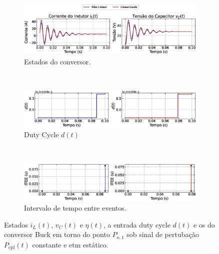 \begin{figure}[H]
  \centering
  \captionsetup{justification=centering}
  \begin{subfigure}{1.\textwidth}
    \centering
    \includegraphics[width=1.\textwidth]{figuras/dynamic-etm/buck/sim1/op1/result.eps}
    \caption{Estados do conversor.}
    \label{fig:buck_converter_constant_pcpl_dynamic_etm_op1_a}
  \end{subfigure}
  \\[6pt]
  \begin{subfigure}{1.\textwidth}
    \centering
    \includegraphics[width=1.\textwidth]{figuras/dynamic-etm/buck/sim1/op1/duty-cycle.eps}
    \caption{Duty Cycle $d(t)$}
    \label{fig:buck_converter_constant_pcpl_dynamic_etm_op1_b}
  \end{subfigure}
  \\[6pt]
  \begin{subfigure}{1.\textwidth}
    \centering
    \includegraphics[width=1.\textwidth]{figuras/dynamic-etm/buck/sim1/op1/inter-event-times.eps}
    \caption{Intervalo de tempo entre eventos.}
    \label{fig:buck_converter_constant_pcpl_dynamic_etm_op1_c}
  \end{subfigure}
  \caption{Estados $i_L(t)$, $v_C(t)$ e $\eta(t)$, a entrada duty cycle $d(t)$ e os  do conversor Buck em torno do ponto $P_{\mathrm{o}, 1}$ sob sinal de pertubação $P_{\mathrm{cpl}}(t)$ constante e \acrshort{etm} estático.}
  \label{fig:buck_converter_constant_pcpl_dynamic_etm_op1}
\end{figure}

